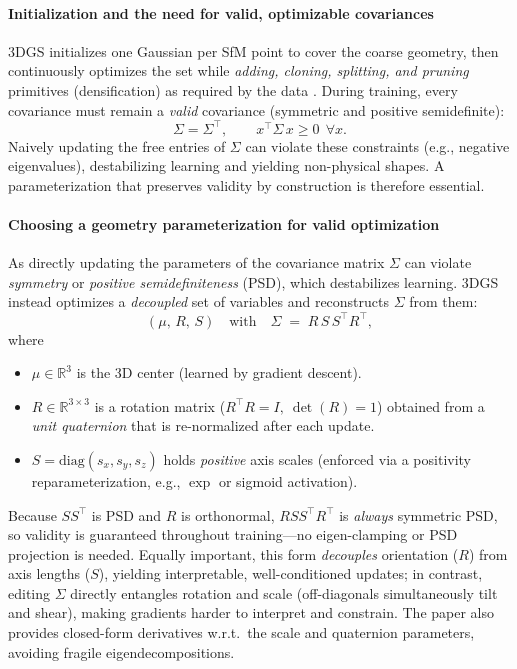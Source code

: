 \begin{enrichment}
\begin{enrichment}
\begin{enrichment}
        \paragraph{Initialization and the need for valid, optimizable covariances}
        3DGS initializes one Gaussian per SfM point to cover the coarse geometry, then continuously optimizes the set while \emph{adding, cloning, splitting, and pruning} primitives (densification) as required by the data \cite{kerbl2023_3dgaussiansplatting}.
        During training, every covariance must remain a \emph{valid} covariance (symmetric and positive semidefinite):
        \[
        \Sigma=\Sigma^\top,\qquad x^\top\Sigma\,x\ge 0\ \ \forall x.
        \]
        Naively updating the free entries of $\Sigma$ can violate these constraints (e.g., negative eigenvalues), destabilizing learning and yielding non-physical shapes. A parameterization that preserves validity by construction is therefore essential.
        
        \paragraph{Choosing a geometry parameterization for valid optimization}
        As directly updating the parameters of the covariance matrix $\Sigma$ can violate \emph{symmetry} or \emph{positive semidefiniteness} (PSD), which destabilizes learning. 
        3DGS instead optimizes a \emph{decoupled} set of variables and reconstructs $\Sigma$ from them:
        \[
        (\mu,\,R,\,S)\quad\text{with}\quad \Sigma \;=\; R\,S\,S^\top R^\top,
        \]
        where
        \begin{itemize}
            \item $\mu\in\mathbb{R}^3$ is the 3D center (learned by gradient descent).
            \item $R\in\mathbb{R}^{3\times3}$ is a rotation matrix ($R^\top R=I,\ \det(R)=1$) obtained from a \emph{unit quaternion} that is re-normalized after each update.
            \item $S=\mathrm{diag}(s_x,s_y,s_z)$ holds \emph{positive} axis scales (enforced via a positivity reparameterization, e.g., $\exp$ or sigmoid activation).
        \end{itemize}
        Because $S S^\top$ is PSD and $R$ is orthonormal, $R S S^\top R^\top$ is \emph{always} symmetric PSD, so validity is guaranteed throughout training—no eigen-clamping or PSD projection is needed. 
        Equally important, this form \emph{decouples} orientation ($R$) from axis lengths ($S$), yielding interpretable, well-conditioned updates; in contrast, editing $\Sigma$ directly entangles rotation and scale (off-diagonals simultaneously tilt and shear), making gradients harder to interpret and constrain.
        The paper also provides closed-form derivatives w.r.t.\ the scale and quaternion parameters, avoiding fragile eigendecompositions.
        

\end{enrichment}
\end{enrichment}
\end{enrichment}
